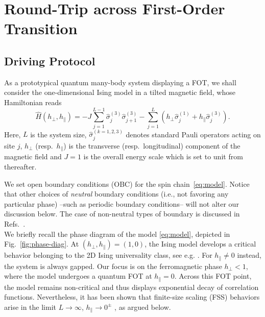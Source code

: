 \renewcommand{\be}{\begin{equation}}
\renewcommand{\ee}{\end{equation}}

\section{Round-Trip across First-Order Transition}
\label{rtripfoqt}

\subsection{Driving Protocol}

As a prototypical quantum many-body system displaying a FOT, we shall consider the one-dimensional Ising model in a tilted magnetic field, whose Hamiltonian reads
\be\label{eq:model}
\hat{H}(h_\perp,h_\parallel)=-J\sum_{j=1}^{L-1} \hat\sigma^{(3)}_j\hat\sigma^{(3)}_{j+1} -\sum_{j=1}^L (h_\perp\hat\sigma^{(1)}_j + h_\parallel \hat\sigma^{(3)}_j).
\ee
Here, $L$ is the system size, $\hat\sigma _j^{(k=1,2,3)}$ denotes standard Pauli operators acting on site $j$, $h_\perp$ (resp.~$h_\parallel$) is the transverse (resp.~longitudinal) component of the magnetic field and $J=1$ is the overall energy scale which is set to unit from thereafter.

 We set open boundary conditions (OBC) for the spin chain~\eqref{eq:model}. Notice that other choices of {\it neutral} boundary conditions (i.e., not favoring any particular phase) --such as periodic boundary conditions-- will not alter our discussion below. The case of non-neutral types of boundary is discussed in Refs.~\cite{fontana2019scaling,pelissetto2020scaling,panagopoulos2018dynamic,campostrini2015quantum,pelissetto2018finite,rossini2018ground}. \\

We briefly recall the phase diagram of the model \eqref{eq:model}, depicted in Fig.~\ref{fig:phase-diag}. At $(h_\perp,h_\parallel)=(1,0)$, the Ising model develops a critical behavior belonging to the 2D Ising universality class, see e.g. \cite{S99}. For $h_\parallel\neq 0$ instead, the system is always gapped. Our focus is on the ferromagnetic phase $h_\perp<1$, where the model undergoes a quantum FOT at $h_\parallel=0$. Across this FOT point, the model remains non-critical and thus displays exponential decay of correlation functions. Nevertheless, it has been shown that finite-size scaling (FSS) behaviors arise in the limit $L\to\infty$, $h_\parallel\to0^\pm$ \cite{P90}, as argued below.\\

